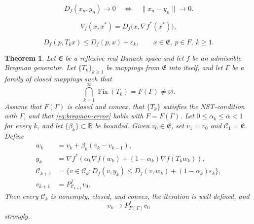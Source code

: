 \documentclass[10pt,a4paper]{amsart}
\newtheorem{theorem}{Theorem}
\newcommand{\C}{\mathscr{C}}
\newcommand{\E}{\mathfrak{E}}
\newcommand{\Fix}{\operatorname{Fix}}
\def\R{\mathbb{R}}
\begin{document}
 \begin{equation}\label{eq:bregman-consistency}
  D_f(x_n,y_n)\to0
  \quad\Longleftrightarrow\quad
  \|x_n-y_n\|\to0.
 \end{equation}

\begin{equation}\label{eq:V-identity}
 V_f(x,x^*)=D_f\bigl(x,\nabla f^*(x^*)\bigr),
\end{equation}

\begin{equation}\label{eq:bregman-error}
 D_f(p,T_kx)\leq D_f(p,x)+\varepsilon_k,
 \qquad x\in\E,\ p\in F,\ k\geq1.
\end{equation}

\begin{theorem}\label{thm:bregman}
Let $\E$ be a reflexive real Banach space and let $f$ be an admissible Bregman generator. Let $\{T_k\}_{k\geq1}$ be mappings from $\E$ into itself, and let $\Gamma$ be a family of closed mappings such that
\[
 \bigcap_{k=1}^{\infty}\Fix(T_k)=F(\Gamma)\neq\varnothing.
\]
Assume that $F(\Gamma)$ is closed and convex, that $\{T_k\}$ satisfies the NST-condition with $\Gamma$, and that \eqref{eq:bregman-error} holds with $F=F(\Gamma)$. Let $0\leq\alpha_k\leq\overline\alpha<1$ for every $k$, and let $\{\beta_k\}\subset\R$ be bounded. Given $v_0\in\E$, set $v_1=v_0$ and $\C_1=\E$. Define
\begin{equation}\label{eq:bregman-algorithm}
\begin{aligned}
 w_k&=v_k+\beta_k(v_k-v_{k-1}),\\
 y_k&=\nabla f^*\!\left(\alpha_k\nabla f(w_k)
 +(1-\alpha_k)\nabla f(T_kw_k)\right),\\
 \C_{k+1}
 &=\bigl\{v\in\C_k:
 D_f(v,y_k)\leq D_f(v,w_k)+(1-\alpha_k)\varepsilon_k\bigr\},\\
 v_{k+1}&=P_{\C_{k+1}}^f v_0.
\end{aligned}
\end{equation}
Then every $\C_k$ is nonempty, closed, and convex, the iteration is well defined, and
\[
 v_k\longrightarrow P_{F(\Gamma)}^f v_0
\]
strongly.
\end{theorem}
\end{document}
